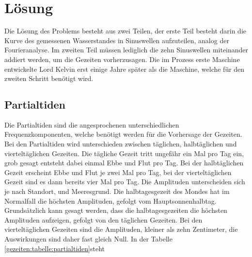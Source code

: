%
%
%
%
\section{Lösung
	\label{gezeiten:section:Lösung}}
Die Lösung des Problems besteht aus zwei Teilen, der erste Teil besteht darin die Kurve des gemessenen Wasserstandes in Sinuswellen aufzuteilen, analog der Fourieranalyse.
Im zweiten Teil müssen lediglich die zehn Sinuswellen miteinander addiert werden, um die Gezeiten vorherzusagen.
Die im Prozess erste Maschine entwickelte Lord Kelvin erst einige Jahre später als die Maschine, welche für den zweiten Schritt benötigt wird.

\subsection{Partialtiden}
Die Partialtiden sind die angesprochenen unterschiedlichen Frequenzkomponenten, welche benötigt werden für die Vorhersage der Gezeiten.
Bei den Partialtiden wird unterschieden zwischen täglichen, halbtäglichen und vierteltäglichen Gezeiten.
Die tägliche Gezeit tritt ungefähr ein Mal pro Tag ein, grob gesagt entsteht dabei einmal Ebbe und Flut pro Tag.
Bei der halbtäglichen Gezeit erscheint Ebbe und Flut je zwei Mal pro Tag, bei der vierteltäglichen Gezeit sind es dann bereits vier Mal pro Tag.
Die Amplituden unterscheiden sich je nach Standort, und Meeresgrund.
Die halbtagesgezeit des Mondes hat im Normalfall die höchsten Amplituden, gefolgt vom Hauptsonnenhalbtag.
Grundsätzlich kann gesagt werden, dass die halbtagesgezeiten die höchsten Amplituden aufzeigen, gefolgt von den täglichen Gezeiten.
Bei den vierteltäglichen Gezeiten sind die Amplituden, kleiner als zehn Zentimeter, die Auswirkungen sind daher fast gleich Null.
In der Tabelle \ref{gezeiten:tabelle:partialtiden}steht 

